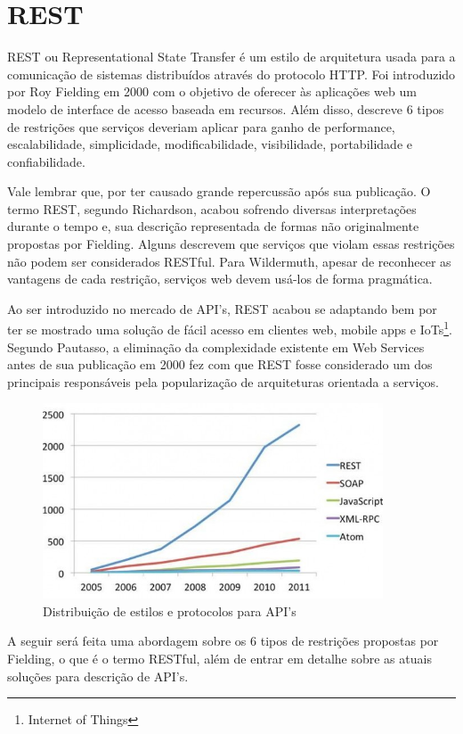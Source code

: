 \section{REST}

REST ou Representational State Transfer é um estilo de arquitetura usada para a comunicação de sistemas distribuídos através do protocolo HTTP. Foi introduzido por Roy Fielding em 2000 com o objetivo de oferecer às aplicações web um modelo de interface de acesso baseada em recursos. Além disso, descreve 6 tipos de restrições que serviços deveriam aplicar para ganho de performance, escalabilidade, simplicidade, modificabilidade, visibilidade, portabilidade e confiabilidade.

Vale lembrar que, por ter causado grande repercussão após sua publicação. O termo REST, segundo Richardson, acabou sofrendo diversas interpretações durante o tempo e, sua descrição representada de formas não originalmente propostas por Fielding. Alguns descrevem que serviços que violam essas restrições não podem ser considerados RESTful. Para Wildermuth, apesar de reconhecer as vantagens de cada restrição, serviços web devem usá-los de forma pragmática. \cite{RichardsonEtAl2013} \cite{Wildermuth2015}

Ao ser introduzido no mercado de API's, REST acabou se adaptando bem por ter se mostrado uma solução de fácil acesso em clientes web, mobile apps e IoTs\footnote{
  Internet of Things
}. Segundo Pautasso, a eliminação da complexidade existente em Web Services antes de sua publicação em 2000 fez com que REST fosse considerado um dos principais responsáveis pela popularização de arquiteturas orientada a serviços. \cite{PautassoEtAl2008}

\begin{figure}[H]
  \centering    \includegraphics[width=0.9\textwidth,height=\textheight,keepaspectratio]{figuras/api-styles.jpg}
  \caption{Distribuição de estilos e protocolos para API's}
\end{figure}

A seguir será feita uma abordagem sobre os 6 tipos de restrições propostas por Fielding, o que é o termo RESTful, além de entrar em detalhe sobre as atuais soluções para descrição de API's.




